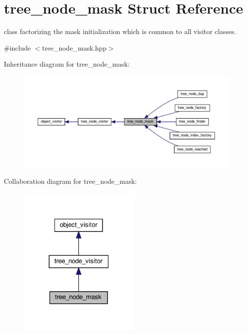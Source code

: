 \hypertarget{structtree__node__mask}{}\section{tree\+\_\+node\+\_\+mask Struct Reference}
\label{structtree__node__mask}


class factorizing the mask initialization which is common to all visitor classes.  




{\ttfamily \#include $<$tree\+\_\+node\+\_\+mask.\+hpp$>$}



Inheritance diagram for tree\+\_\+node\+\_\+mask\+:
\nopagebreak
\begin{figure}[H]
\begin{center}
\leavevmode
\includegraphics[width=350pt]{d7/d55/structtree__node__mask__inherit__graph}
\end{center}
\end{figure}


Collaboration diagram for tree\+\_\+node\+\_\+mask\+:
\nopagebreak
\begin{figure}[H]
\begin{center}
\leavevmode
\includegraphics[width=171pt]{d9/d73/structtree__node__mask__coll__graph}
\end{center}
\end{figure}
